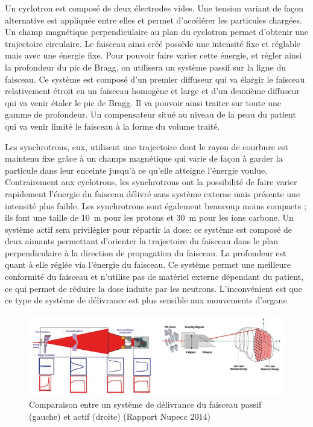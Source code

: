 \documentclass[11pt,a4paper,oldfontcommands]{memoir}
\begin{document}
Un cyclotron est composé de deux électrodes vides. Une tension variant de façon alternative est appliquée entre elles et permet d'accélérer les particules chargées. Un champ magnétique perpendiculaire au plan du cyclotron permet d'obtenir une trajectoire circulaire. Le faisceau ainsi créé possède une intensité fixe et réglable mais avec une énergie fixe. Pour pouvoir faire varier cette énergie, et régler ainsi la profondeur du pic de Bragg, on utilisera un système passif sur la ligne du faisceau. Ce système est composé d'un premier diffuseur qui va élargir le faisceau relativement étroit en un faisceau homogène et large et d'un deuxième diffuseur qui va venir étaler le pic de Bragg. Il va pouvoir ainsi traiter sur toute une gamme de profondeur. Un compensateur situé au niveau de la peau du patient qui va venir limité le faisceau à la forme du volume traité.

Les synchrotrons, eux, utilisent une trajectoire dont le rayon de courbure est maintenu fixe grâce à un champs magnétique qui varie de façon à garder la particule dans leur enceinte jusqu'à ce qu'elle atteigne l'énergie voulue. Contrairement aux cyclotrons, les synchrotrons ont la possibilité de faire varier rapidement l'énergie du faisceau délivré sans système externe mais présente une intensité plus faible. Les synchrotrons sont également beaucoup moins compacts ; ils font une taille de 10~m pour les protons et 30~m pour les ions carbone. Un système actif sera privilégier pour répartir la dose: ce système est composé de deux aimants permettant d'orienter la trajectoire du faisceau dans le plan perpendiculaire à la direction de propagation du faisceau. La profondeur est quant à elle réglée via l'énergie du faisceau. Ce système permet une meilleure conformité du faisceau et n'utilise pas de matériel externe dépendant du patient, ce qui permet de réduire la dose induite par les neutrons. L'inconvénient est que ce type de système de délivrance est plus sensible aux mouvements d'organe. 

\begin{figure}[h!]
    \centering
    \includegraphics [scale = 0.7]{intro/Passive-left-and-active-right-beam-delivery-system-courtesy-of-IBA.png}
    \caption{Comparaison entre un système de délivrance du faisceau passif (gauche) et actif (droite) (Rapport Nupecc 2014)}
    \label{fig:my_label}
\end{figure}
\openany
\end{document}
